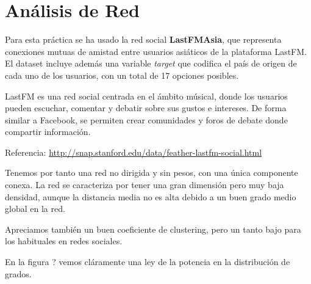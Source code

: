\section{Análisis de Red}


Para esta práctica se ha usado la red social \textbf{LastFMAsia}, que representa conexiones mutuas de amistad entre usuarios asiáticos de la plataforma LastFM. El dataset incluye además una variable \textit{target} que codifica el país de origen de cada uno de los usuarios, con un total de 17 opciones posibles.

LastFM es una red social centrada en el ámbito músical, donde los usuarios pueden escuchar, comentar y debatir sobre sus gustos e intereses. De forma similar a Facebook, se permiten crear comunidades y foros de debate donde compartir información.

Referencia: \url{http://snap.stanford.edu/data/feather-lastfm-social.html}

\vspace{\baselineskip}

Tenemos por tanto una red no dirigida y sin pesos, con una única componente conexa. La red se caracteriza por tener una gran dimensión pero muy baja densidad, aunque la distancia media no es alta debido a un buen grado medio global en la red.

Apreciamos también un buen coeficiente de clustering, pero un tanto bajo para los habituales en redes sociales.

\vspace{\baselineskip}

En la figura ? vemos cláramente una ley de la potencia en la distribución de grados.